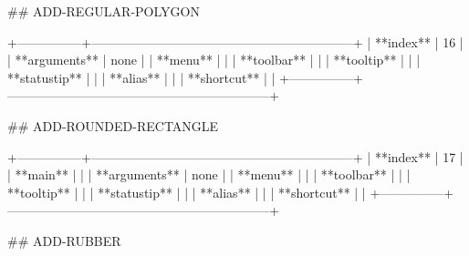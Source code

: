 ## ADD-REGULAR-POLYGON

+---------------+--------------------------------------------------------------+
| **index**     | 16                                                           |
| **arguments** | none                                                         |
| **menu**      |                                                              |
| **toolbar**   |                                                              |
| **tooltip**   |                                                              |
| **statustip** |                                                              |
| **alias**     |                                                              |
| **shortcut**  |                                                              |
+---------------+--------------------------------------------------------------+


## ADD-ROUNDED-RECTANGLE

+---------------+--------------------------------------------------------------+
| **index**     | 17                                                           |
| **main**      |                                                              |
| **arguments** | none                                                         |
| **menu**      |                                                              |
| **toolbar**   |                                                              |
| **tooltip**   |                                                              |
| **statustip** |                                                              |
| **alias**     |                                                              |
| **shortcut**  |                                                              |
+---------------+--------------------------------------------------------------+

## ADD-RUBBER

